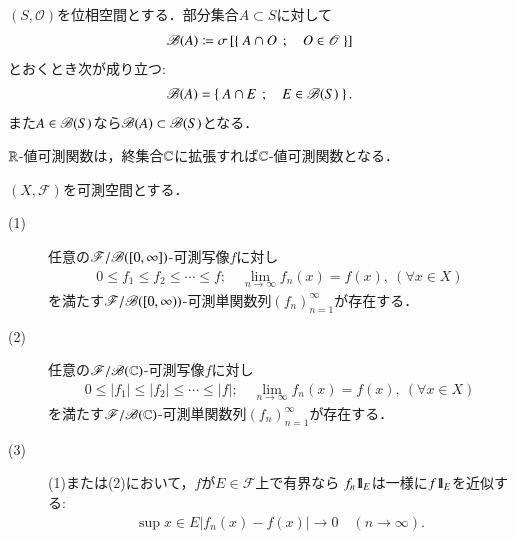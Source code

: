 	\begin{screen}
		\begin{thm}[相対位相のBorel集合族]\label{thm:Borel_algebra_of_relative_topology}
			$(S,\mathscr{O})$を位相空間とする．部分集合$A \subset S$に対して
			\begin{align}
				\mathscr{B}(A) \coloneqq \sigma\left[ \left\{\ A \cap O\ \, ; \quad O \in \mathscr{O}\ \right\} \right]
			\end{align}
			とおくとき次が成り立つ:
			\begin{align}
				\mathscr{B}(A) = \left\{\ A \cap E\ \, ; \quad E \in \mathscr{B}(S)\ \right\}.
			\end{align}
			また$A \in \mathscr{B}(S)$なら$\mathscr{B}(A) \subset \mathscr{B}(S)$となる．
		\end{thm}
	\end{screen}
	$\mathbb{R}$-値可測関数は，終集合$\mathbb{C}$に拡張すれば$\mathbb{C}$-値可測関数となる．
	
	\begin{screen}
		\begin{thm}[単関数近似列の存在]
			$(X,\mathscr{F})$を可測空間とする．
			\begin{description} 
				\item[(1)] 任意の$\mathscr{F}/\mathscr{B}([0,\infty])$-可測写像$f$に対し
					\begin{align}
						0 \leq f_1 \leq f_2 \leq \cdots \leq f;
						\quad \lim_{n \to \infty} f_n(x) = f(x),\ (\forall x \in X)
					\end{align}
					を満たす$\mathscr{F}/\mathscr{B}([0,\infty))$-可測単関数列$(f_n)_{n=1}^\infty$が存在する．
					
				\item[(2)]
					 任意の$\mathscr{F}/\mathscr{B}(\mathbb{C})$-可測写像$f$に対し
					\begin{align}
						0 \leq |f_1| \leq |f_2| \leq \cdots \leq |f|;
						\quad \lim_{n \to \infty} f_n(x) = f(x),\ (\forall x \in X)
					\end{align}
					を満たす$\mathscr{F}/\mathscr{B}(\mathbb{C})$-可測単関数列$(f_n)_{n=1}^\infty$が存在する．
				
				\item[(3)] (1)または(2)において，$f$が$E \in \mathscr{F}$上で有界なら
					$f_n \mbox{1}\hspace{-0.25em}\mbox{l}_E$は一様に$f \mbox{1}\hspace{-0.25em}\mbox{l}_E$を近似する:
					\begin{align}
						\sup{x \in E}{\left| f_n(x) - f(x) \right|} \longrightarrow 0
						\quad (n \longrightarrow \infty).
					\end{align}
			\end{description}
		\end{thm}
	\end{screen}
	
